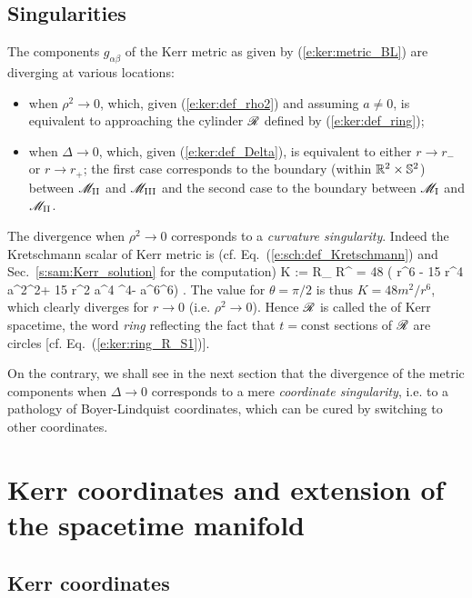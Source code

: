\subsection{Singularities}

The components $g_{\alpha\beta}$ of the Kerr metric as given by  (\ref{e:ker:metric_BL})
are diverging at various locations:
\begin{itemize}
\item when $\rho^2\rightarrow 0$, which, given (\ref{e:ker:def_rho2})
and assuming $a\not=0$, is equivalent to approaching
the cylinder $\mathscr{R}$ defined by (\ref{e:ker:def_ring});
\item when $\Delta\rightarrow 0$, which, given (\ref{e:ker:def_Delta}), is equivalent to either $r\rightarrow r_-$
or $r\rightarrow r_+$; the first case corresponds to the boundary (within $\mathbb{R}^2\times\mathbb{S}^2$)
between $\mathscr{M}_{\rm II}$ and $\mathscr{M}_{\rm III}$ and the second case to the boundary
between $\mathscr{M}_{\rm I}$ and $\mathscr{M}_{\rm II}$.
\end{itemize}
The divergence when $\rho^2\rightarrow 0$ corresponds to a
\emph{curvature singularity}.
Indeed the Kretschmann scalar of Kerr metric is (cf.
Eq.~(\ref{e:sch:def_Kretschmann}) and Sec.~\ref{s:sam:Kerr_solution} for the computation)
\be
    K := R_{\mu\nu\rho\sigma} R^{\mu\nu\rho\sigma}
     = 48  \left( r^6 - 15 r^4 a^2\cos^2\th + 15 r^2 a^4 \cos^4\th - a^6\cos^6\th \right) .
\ee
The value for $\theta=\pi/2$ is thus $K = 48 m^2 / r^6$, which clearly diverges
for $r\rightarrow 0$ (i.e. $\rho^2\rightarrow 0$).
Hence $\mathscr{R}$ is called the
of Kerr spacetime, the word \emph{ring} reflecting the fact that $t=\mathrm{const}$
sections of $\mathscr{R}$ are circles [cf. Eq.~(\ref{e:ker:ring_R_S1})].

On the contrary, we shall see in the next section that the divergence
of the metric components when $\Delta\rightarrow 0$ corresponds to
a mere
\emph{coordinate singularity},
i.e. to a pathology of Boyer-Lindquist coordinates, which can be cured by switching to
other coordinates.

\section{Kerr coordinates and extension of the spacetime manifold}

\subsection{Kerr coordinates}

